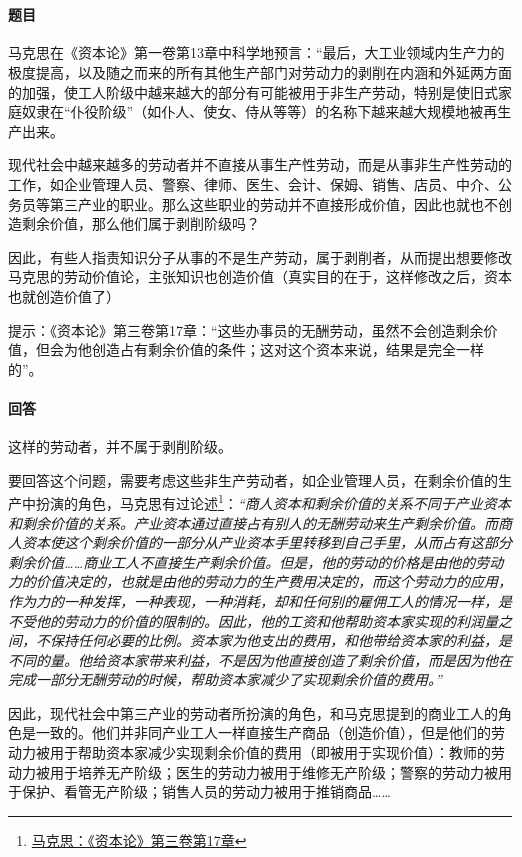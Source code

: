 \documentclass[a4paper]{article}
\begin{document}
\courseheader
{}
~
\paragraph{题目}
马克思在《资本论》第一卷第13章中科学地预言：“最后，大工业领域内生产力的极度提高，以及随之而来的所有其他生产部门对劳动力的剥削在内涵和外延两方面的加强，使工人阶级中越来越大的部分有可能被用于非生产劳动，特别是使旧式家庭奴隶在“仆役阶级”（如仆人、使女、侍从等等）的名称下越来越大规模地被再生产出来。

现代社会中越来越多的劳动者并不直接从事生产性劳动，而是从事非生产性劳动的工作，如企业管理人员、警察、律师、医生、会计、保姆、销售、店员、中介、公务员等第三产业的职业。那么这些职业的劳动并不直接形成价值，因此也就也不创造剩余价值，那么他们属于剥削阶级吗？

因此，有些人指责知识分子从事的不是生产劳动，属于剥削者，从而提出想要修改马克思的劳动价值论，主张知识也创造价值（真实目的在于，这样修改之后，资本也就创造价值了）

提示：《资本论》第三卷第17章：“这些办事员的无酬劳动，虽然不会创造剩余价值，但会为他创造占有剩余价值的条件；这对这个资本来说，结果是完全一样的”。
\paragraph{回答}
这样的劳动者，并不属于剥削阶级。

要回答这个问题，需要考虑这些非生产劳动者，如企业管理人员，在剩余价值的生产中扮演的角色，马克思有过论述\footnote{\href{https://www.marxists.org/chinese/marx-engels/25/018.htm}{马克思：《资本论》第三卷第17章}}：\emph{“商人资本和剩余价值的关系不同于产业资本和剩余价值的关系。产业资本通过直接占有别人的无酬劳动来生产剩余价值。而商人资本使这个剩余价值的一部分从产业资本手里转移到自己手里，从而占有这部分剩余价值……商业工人不直接生产剩余价值。但是，他的劳动的价格是由他的劳动力的价值决定的，也就是由他的劳动力的生产费用决定的，而这个劳动力的应用，作为力的一种发挥，一种表现，一种消耗，却和任何别的雇佣工人的情况一样，是不受他的劳动力的价值的限制的。因此，他的工资和他帮助资本家实现的利润量之间，不保持任何必要的比例。资本家为他支出的费用，和他带给资本家的利益，是不同的量。他给资本家带来利益，不是因为他直接创造了剩余价值，而是因为他在完成一部分无酬劳动的时候，帮助资本家减少了实现剩余价值的费用。”}

因此，现代社会中第三产业的劳动者所扮演的角色，和马克思提到的商业工人的角色是一致的。他们并非同产业工人一样直接生产商品（创造价值），但是他们的劳动力被用于帮助资本家减少实现剩余价值的费用（即被用于实现价值）：教师的劳动力被用于培养无产阶级；医生的劳动力被用于维修无产阶级；警察的劳动力被用于保护、看管无产阶级；销售人员的劳动力被用于推销商品……
\end{document}
